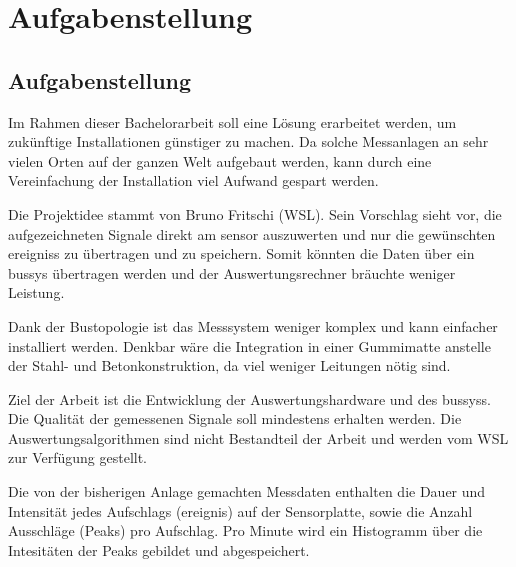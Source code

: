 %
%

\chapter{Aufgabenstellung}\label{chap.aufgabenstellung}



\section{Aufgabenstellung}\label{sec.aufgabenstellung}
Im Rahmen dieser Bachelorarbeit soll eine Lösung erarbeitet werden, um zukünftige Installationen günstiger zu machen. Da solche Messanlagen an sehr vielen Orten auf der ganzen Welt aufgebaut werden, kann durch eine Vereinfachung der Installation viel Aufwand gespart werden. 

Die Projektidee stammt von Bruno Fritschi (WSL). Sein Vorschlag sieht vor, die aufgezeichneten Signale direkt am \gls{sensor} auszuwerten und nur die gewünschten \glspl{ereignis} zu übertragen und zu speichern. Somit könnten die Daten über ein \gls{bussys} übertragen werden und der Auswertungsrechner bräuchte weniger Leistung.

Dank der Bustopologie ist das Messsystem weniger komplex und kann einfacher installiert werden. Denkbar wäre die Integration in einer Gummimatte anstelle der Stahl- und Betonkonstruktion, da viel weniger Leitungen nötig sind.

Ziel der Arbeit ist die Entwicklung der Auswertungshardware und des \gls{bussys}s. Die Qualität der gemessenen Signale soll mindestens erhalten werden. Die Auswertungsalgorithmen sind nicht Bestandteil der Arbeit und werden vom WSL zur Verfügung gestellt.

Die von der bisherigen Anlage gemachten Messdaten enthalten die Dauer und Intensität jedes Aufschlags (\gls{ereignis}) auf der Sensorplatte, sowie die Anzahl Ausschläge (Peaks) pro Aufschlag. Pro Minute wird ein Histogramm über die Intesitäten der Peaks gebildet und abgespeichert.

